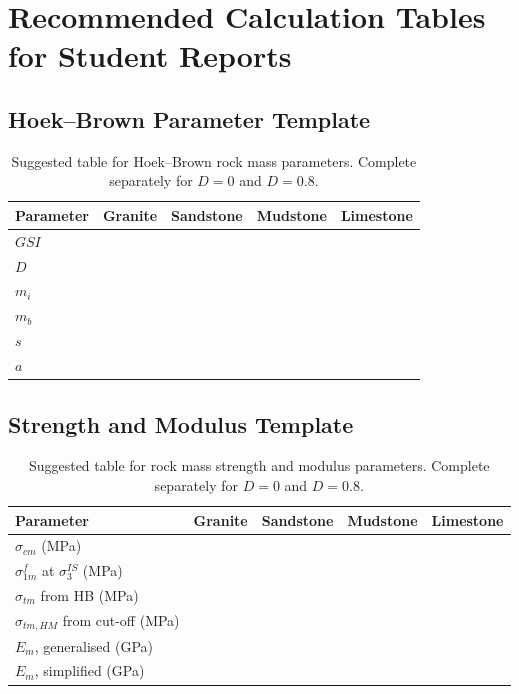 \documentclass[a4paper,12pt]{article}
\begin{document}
\section{Recommended Calculation Tables for Student Reports}

\subsection{Hoek--Brown Parameter Template}

\begin{table}[H]
\centering
\small
\begin{tabularx}{0.95\textwidth}{l c c c c}
\toprule
\textbf{Parameter} & \textbf{Granite} & \textbf{Sandstone} & \textbf{Mudstone} & \textbf{Limestone} \\
\midrule
\(GSI\) & & & & \\
\(D\) & & & & \\
\(m_i\) & & & & \\
\(m_b\) & & & & \\
\(s\) & & & & \\
\(a\) & & & & \\
\bottomrule
\end{tabularx}
\caption{Suggested table for Hoek--Brown rock mass parameters. Complete separately for \(D=0\) and \(D=0.8\).}
\label{tab:hb_template}
\end{table}

\subsection{Strength and Modulus Template}

\begin{table}[H]
\centering
\small
\begin{tabularx}{0.95\textwidth}{l c c c c}
\toprule
\textbf{Parameter} & \textbf{Granite} & \textbf{Sandstone} & \textbf{Mudstone} & \textbf{Limestone} \\
\midrule
\(\sigma_{cm}\) (MPa) & & & & \\
\(\sigma_{1m}^f\) at \(\sigma_3^{IS}\) (MPa) & & & & \\
\(\sigma_{tm}\) from HB (MPa) & & & & \\
\(\sigma_{tm,HM}\) from cut-off (MPa) & & & & \\
\(E_m\), generalised (GPa) & & & & \\
\(E_m\), simplified (GPa) & & & & \\
\bottomrule
\end{tabularx}
\caption{Suggested table for rock mass strength and modulus parameters. Complete separately for \(D=0\) and \(D=0.8\).}
\label{tab:strength_template}
\end{table}
\end{document}
